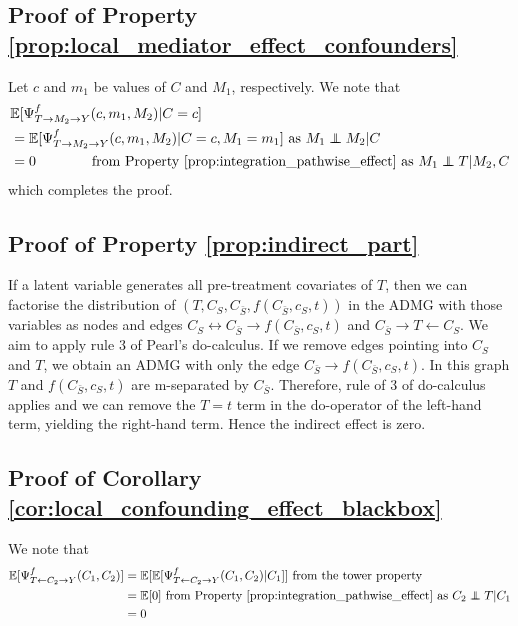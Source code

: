 \documentclass{article}
\theoremstyle{plain}
\theoremstyle{definition}
\theoremstyle{remark}
\newcommand{\effect}{\Psi}
\theoremstyle{mystyle}
\newcommand{\indep}{\perp\!\!\!\!\perp}
\begin{document}
\fi

\subsection{Proof of Property \ref{prop:local_mediator_effect_confounders}}

\label{proof:local_mediator_effect_confounders}

Let $c$ and $m_1$ be values of $C$ and $M_1$, respectively. We note that
\begin{align*}
    &\mathbb{E}[\effect^f_{T \rightarrow M_2 \rightarrow Y}(c,m_1,M_2) | C=c] \\
    &= \mathbb{E}[\effect^f_{T \rightarrow M_2 \rightarrow Y}(c,m_1,M_2) | C=c, M_1=m_1]  \text{ as } M_1 \indep M_2 | C \\
    &= 0 \ \ \ \ \ \ \ \ \ \ \ \text{ from Property \ref{prop:integration_pathwise_effect} as } M_1 \indep T | M_2, C \\
\end{align*}
which completes the proof.
 

\subsection{Proof of Property \ref{prop:indirect_part}}
\label{proof:indirect_part}

If a latent variable generates all pre-treatment covariates of $T$, then we can factorise the distribution of $(T,C_S,C_{\bar{S}},f\left({C}_{\bar{S}}, c_{S}, t\right))$ in the ADMG with those variables as nodes and edges $C_S \leftrightarrow C_{\bar{S}} \rightarrow f\left({C}_{\bar{S}}, c_{S}, t\right)$ and $C_{\bar{S}} \rightarrow T \gets C_S$.  We aim to apply rule 3 of Pearl's do-calculus. If we remove edges pointing into $C_S$ and $T$, we obtain an ADMG with only the edge $C_{\bar{S}} \rightarrow f\left({C}_{\bar{S}}, c_{S}, t\right)$. In this graph $T$ and $f\left({C}_{\bar{S}}, c_{S}, t\right)$ are m-separated by ${C}_{\bar{S}}$. Therefore, rule of 3 of do-calculus applies and we can remove the $T=t$ term in the do-operator of the left-hand term, yielding the right-hand term. Hence the indirect effect is zero.




\subsection{Proof of Corollary \ref{cor:local_confounding_effect_blackbox}}
\label{proof:local_confounding_effect_blackbox}
We note that
\begin{align*}
    \mathbb{E}[\effect^f_{T \leftarrow C_2 \rightarrow Y}(C_1,C_2)]
    &= \mathbb{E}[\mathbb{E}[\effect^f_{T \leftarrow C_2 \rightarrow Y}(C_1,C_2) | C_1]] \text{ from the tower property} \\
    &= \mathbb{E}[0] \text{ from Property \ref{prop:integration_pathwise_effect} as } C_2 \indep T | C_1 \\
    &= 0 \\
\end{align*}
\end{document}
